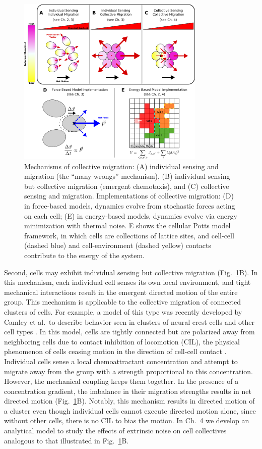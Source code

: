 \begin{figure}[ht]
    \centering
        \includegraphics[width=0.8\textwidth]{../fig/ch1_fig3.png}
    \caption{Mechanisms of collective migration: (A) individual sensing and migration (the ``many wrongs'' mechanism), (B) individual sensing but collective migration (emergent chemotaxis), and (C) collective sensing and migration. Implementations of collective migration: (D) in force-based models, dynamics evolve from stochastic forces acting on each cell; (E) in energy-based models, dynamics evolve via energy minimization with thermal noise. E shows the cellular Potts model framework, in which cells are collections of lattice sites, and cell-cell (dashed blue) and cell-environment (dashed yellow) contacts contribute to the energy of the system.}
\label{fig:ch1_3}
\end{figure}


Second, cells may exhibit individual sensing but collective migration (Fig.\ \ref{fig:ch1_3}B). In this mechanism, each individual cell senses its own local environment, and tight mechanical interactions result in the emergent directed motion of the entire group. This mechanism is applicable to the collective migration of connected clusters of cells. For example, a model of this type was recently developed by Camley et al.\ to describe behavior seen in clusters of neural crest cells and other cell types \cite{camley2016emergent}. In this model, cells are tightly connected but are polarized away from neighboring cells due to contact inhibition of locomotion (CIL), the physical phenomenon of cells ceasing motion in the direction of cell-cell contact \cite{mayor2010keeping}. Individual cells sense a local chemoattractant concentration and attempt to migrate away from the group with a strength proportional to this concentration.
However, the mechanical coupling keeps them together. In the presence of a concentration gradient, the imbalance in their migration strengths results in net directed motion (Fig.\ \ref{fig:ch1_3}B). Notably, this mechanism results in directed motion of a cluster even though individual cells cannot execute directed motion alone, since without other cells, there is no CIL to bias the motion. In Ch.\ 4 we develop an analytical model to study the effects of extrinsic noise on cell collectives analogous to that illustrated in Fig.\ \ref{fig:ch1_3}B.

